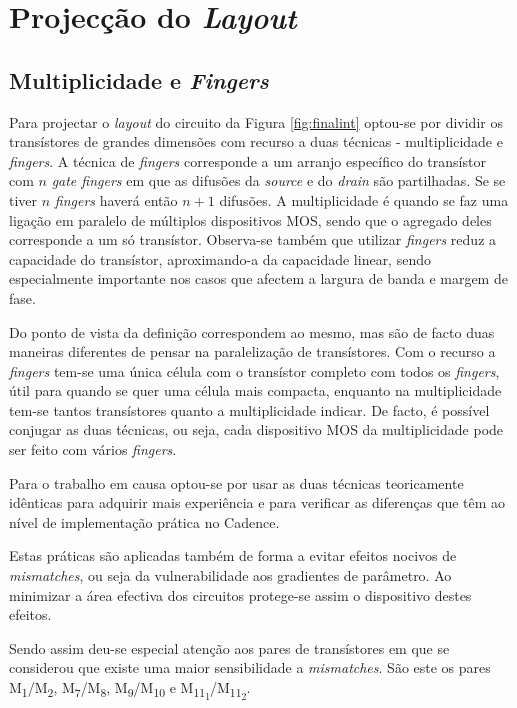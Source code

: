 \documentclass[11pt]{article}
\numberwithin{equation}{section}
\begin{document}
\section{Projecção do \textit{Layout}}

\subsection{Multiplicidade e \textit{Fingers}}

Para projectar o \textit{layout} do circuito da Figura \ref{fig:finalint} optou-se por dividir os transístores de grandes dimensões com recurso a duas técnicas - multiplicidade e \textit{fingers}. A técnica de \textit{fingers} corresponde a um arranjo específico do transístor com $n$ \textit{gate fingers} em que as difusões da \textit{source} e do \textit{drain} são partilhadas. Se se tiver $n$ \textit{fingers} haverá então $n+1$ difusões. A multiplicidade é quando se faz uma ligação em paralelo de múltiplos dispositivos MOS, sendo que o agregado deles corresponde a um só transístor. Observa-se também que utilizar \textit{fingers} reduz a capacidade do transístor, aproximando-a da capacidade linear, sendo especialmente importante nos casos que afectem a largura de banda e margem de fase. 

Do ponto de vista da definição correspondem ao mesmo, mas são de facto duas maneiras diferentes de pensar na paralelização de transístores. Com o recurso a \textit{fingers} tem-se uma única célula com o transístor completo com todos os \textit{fingers}, útil para quando se quer uma célula mais compacta, enquanto na multiplicidade tem-se tantos transístores quanto a multiplicidade indicar. De facto, é possível conjugar as duas técnicas, ou seja, cada dispositivo MOS da multiplicidade pode ser feito com vários \textit{fingers}.

Para o trabalho em causa optou-se por usar as duas técnicas teoricamente idênticas para adquirir mais experiência e para verificar as diferenças que têm ao nível de implementação prática no Cadence.

Estas práticas são aplicadas também de forma a evitar  efeitos nocivos de \textit{mismatches}, ou seja da vulnerabilidade aos gradientes de parâmetro. Ao minimizar a área efectiva dos circuitos protege-se assim o dispositivo destes efeitos.

Sendo assim deu-se especial atenção aos pares de transístores em que se considerou que existe uma maior sensibilidade a \textit{mismatches}. São este os pares M\textsubscript{1}/M\textsubscript{2}, M\textsubscript{7}/M\textsubscript{8}, M\textsubscript{9}/M\textsubscript{10} e M\textsubscript{11\textsubscript{1}}/M\textsubscript{11\textsubscript{2}}. 
\end{document}
